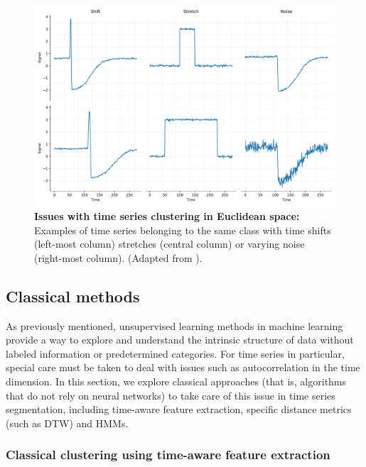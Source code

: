 \begin{figure}[!thb]
\centering
\includegraphics[width=\textwidth]{Figures/sota_1.pdf}

\caption[\textbf{Issues with time series clustering in Euclidean space}]{\textbf{Issues with time series clustering in Euclidean space:} Examples of time series belonging to the same class with time shifts (left-most column) stretches
(central column) or varying noise (right-most column). (Adapted from \cite{Lafabregue2022End-to-endStudy}).}
\label{fig:2.1}

\end{figure}

\subsection{Classical methods}

As previously mentioned, unsupervised learning methods in machine learning provide a way to explore and understand the intrinsic structure of data without labeled information or predetermined categories. For time series in particular, special care must be taken to deal with issues such as autocorrelation in the time dimension. In this section, we explore classical approaches (that is, algorithms that do not rely on neural networks) to take care of this issue in time series segmentation, including time-aware feature extraction, specific distance metrics (such as DTW) and HMMs.

\subsubsection{Classical clustering using time-aware feature extraction}

